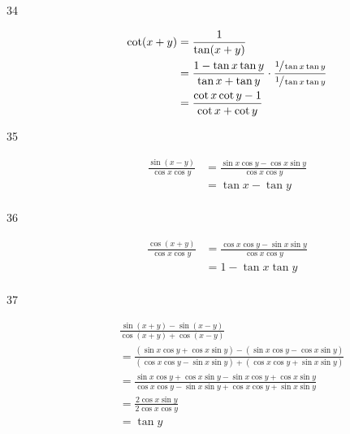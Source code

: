 \documentclass{exam}
\begin{document}
\begin{description}
      \item[34] 
        \begin{align*}
          \cot(x + y) & = \frac{1}{\tan(x + y)} \\
                      & = \frac{1 - \tan x \tan y}{\tan x + \tan y} \cdot \frac{\sfrac{1}{\tan x \tan y}}{\sfrac{1}{\tan x \tan y}} \\
                      & = \frac{\cot x \cot y - 1}{\cot x + \cot y} \\
        \end{align*}

      \item[35] 
        \begin{align*}
          \frac{\sin(x - y)}{\cos x \cos y} & = \frac{\sin x \cos y - \cos x \sin y}{\cos x \cos y} \\
                                            & = \tan x - \tan y \\
        \end{align*}

      \item[36] 
        \begin{align*}
          \frac{\cos(x + y)}{\cos x \cos y} & = \frac{\cos x \cos y - \sin x \sin y}{\cos x \cos y} \\
                                            & = 1 - \tan x \tan y \\
        \end{align*}

      \item[37] 
        \begin{align*}
          & \frac{\sin(x + y) - \sin(x - y)}{\cos(x + y) + \cos(x - y)} \\
          & = \frac{(\sin x \cos y + \cos x \sin y) - (\sin x \cos y - \cos x \sin y)}
                   {(\cos x \cos y - \sin x \sin y) + (\cos x \cos y + \sin x \sin y)} \\
          & = \frac{\sin x \cos y + \cos x \sin y - \sin x \cos y + \cos x \sin y}{\cos x \cos y - \sin x \sin y + \cos x \cos y + \sin x \sin y} \\
          & = \frac{2 \cos x \sin y}{2 \cos x \cos y} \\
          & = \tan y \\
        \end{align*}


\end{description}
\end{document}
